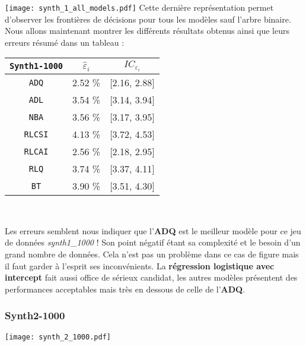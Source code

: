 \documentclass{article}
\begin{document}
\begin{multicols}{2}  
\begingroup
   \centering
   \texttt{[image: synth\_1\_all\_models.pdf]}
    \label{fig_synth_1_model_partition_1000}
\endgroup
Cette dernière représentation permet d'observer les frontières de décisions pour tous les modèles sauf l'arbre binaire.
Nous allons maintenant montrer les différents résultats obtenus ainsi que leurs erreurs résumé dans un tableau :

\begin{center}
\begin{tabular}{| c || c | c |}
\hline
\texttt{Synth1-1000} & $\widehat{\varepsilon}_i$  & $IC_{\varepsilon_{i}}$  \\
\hline
\hline
\texttt{ADQ} & 2.52 \% & [2.16, 2.88] \\
\hline
\texttt{ADL} & 3.54 \% & [3.14, 3.94] \\
\hline
\texttt{NBA} & 3.56 \% & [3.17, 3.95] \\
\hline
\texttt{RLCSI} & 4.13 \% & [3.72, 4.53] \\
\hline
\texttt{RLCAI} & 2.56 \% & [2.18, 2.95] \\
\hline
\texttt{RLQ} &  3.74 \% & [3.37, 4.11] \\
\hline
\texttt{BT} & 3.90 \% & [3.51, 4.30] \\
\hline
\end{tabular}\\ 
\label{table_Synth1-1000}
\end{center}

Les erreurs semblent nous indiquer que l'\textbf{ADQ} est le meilleur modèle pour ce jeu de données \textit{synth1\_1000} ! Son point négatif étant sa complexité et le besoin d'un grand nombre de données. Cela n'est pas un problème dans ce cas de figure mais il faut garder à l'esprit ses inconvénients. La \textbf{régression logistique avec intercept} fait aussi office de sérieux candidat, les autres modèles présentent des performances acceptables mais très en dessous de celle de l'\textbf{ADQ}.

\subsubsection{Synth2-1000}
\label{subsubsec_Synth2_1000}

\begingroup
   \centering
   \texttt{[image: synth\_2\_1000.pdf]}
    \label{fig_synth_2_1000}
\endgroup


\end{multicols}
\end{document}
